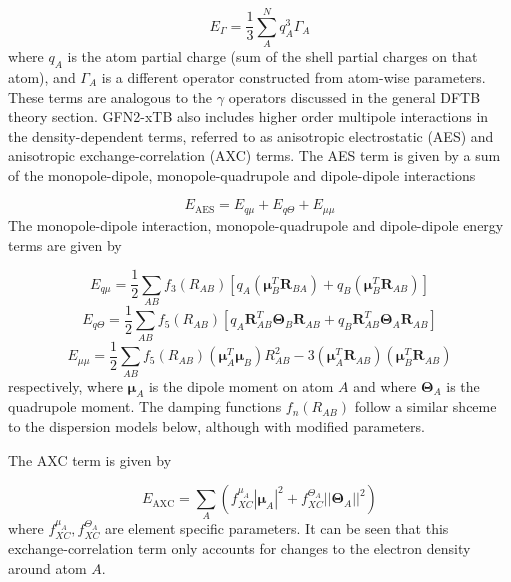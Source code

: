 \begin{equation}
E_\Gamma = \frac{1}{3}\sum_A^N q_A^3 \Gamma_A
\end{equation}
%
where $q_A$ is the atom partial charge (sum of the shell partial charges on that atom), 
and $\Gamma_A$ is a different operator constructed from atom-wise parameters. These
terms are analogous to the $\gamma$ operators discussed in the general DFTB theory
section. GFN2-xTB also includes higher order multipole interactions in the density-dependent
terms, referred to as anisotropic electrostatic (AES) and anisotropic exchange-correlation
(AXC) terms. The AES term is given by a sum of the monopole-dipole, monopole-quadrupole
and dipole-dipole interactions

\begin{equation}
    E_{\text{AES}} = E_{q\mu} + E_{q \Theta} + E_{\mu\mu}
\end{equation}
%
The monopole-dipole interaction, monopole-quadrupole and dipole-dipole energy terms 
are given by

\begin{equation}
    E_{q\mu} = \frac{1}{2} \sum_{AB} f_3\left(R_{AB}\right) \left[ q_A \left(\mathbf{\mu}_B^T \mathbf{R}_{BA}\right) + q_B \left(\mathbf{\mu}_B^T \mathbf{R}_{AB}\right)\right]
\end{equation}
%
\begin{equation}
    E_{q \Theta} = \frac{1}{2} \sum_{AB} f_5\left(R_{AB}\right) \left[ q_A \mathbf{R}^T_{AB} \mathbf{\Theta}_B \mathbf{R}_{AB} + q_B \mathbf{R}^T_{AB} \mathbf{\Theta}_A \mathbf{R}_{AB} \right]
\end{equation}
%
\begin{equation}
    E_{\mu\mu} = \frac{1}{2} \sum_{AB} f_5\left(R_{AB}\right) \left( \mathbf{\mu}_A^T \mathbf{\mu}_B \right) R_{AB}^2 - 3 \left( \mathbf{\mu}_A^T \mathbf{R}_{AB} \right) \left( \mathbf{\mu}_B^T \mathbf{R}_{AB} \right) 
\end{equation}
%
respectively, where  $\mathbf{\mu}_A$ is the dipole moment on atom $A$ and where 
$\mathbf{\Theta}_A$ is the quadrupole moment. The damping functions $f_n \left(R_{AB}\right)$
follow a similar shceme to the dispersion models below, although with modified parameters.

The AXC term is given by 

\begin{equation}
    E_{\text{AXC}} = \sum_A \left( f_{XC}^{\mu_A} \left\lvert \mathbf{\mu}_A\right\rvert^2  + f_{XC}^{\Theta_A} \left\lvert \left\lvert \mathbf{\Theta}_A \right\rvert\right\rvert^2\right)
\end{equation}
%
where $f_{XC}^{\mu_A}, f_{XC}^{\Theta_A}$ are element specific parameters. It can
be seen that this exchange-correlation term only accounts for changes to the electron
density around atom $A$.

